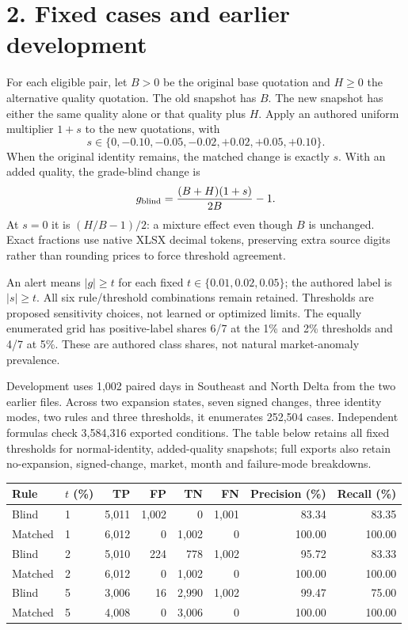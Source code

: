 \documentclass[10pt,letterpaper]{article}
\begin{document}
\section*{2. Fixed cases and earlier development}
For each eligible pair, let $B>0$ be the original base quotation and $H\geq0$ the alternative quality quotation. The old snapshot has $B$. The new snapshot has either the same quality alone or that quality plus $H$. Apply an authored uniform multiplier $1+s$ to the new quotations, with
\[
s\in\{0,-0.10,-0.05,-0.02,+0.02,+0.05,+0.10\}.
\]
When the original identity remains, the matched change is exactly $s$. With an added quality, the grade-blind change is
\[
g_{\rm blind}=\frac{(B+H)(1+s)}{2B}-1.
\]
At $s=0$ it is $(H/B-1)/2$: a mixture effect even though $B$ is unchanged. Exact fractions use native XLSX decimal tokens, preserving extra source digits rather than rounding prices to force threshold agreement.

An alert means $|g|\geq t$ for each fixed $t\in\{0.01,0.02,0.05\}$; the authored label is $|s|\geq t$. All six rule/threshold combinations remain retained. Thresholds are proposed sensitivity choices, not learned or optimized limits. The equally enumerated grid has positive-label shares 6/7 at the 1\% and 2\% thresholds and 4/7 at 5\%. These are authored class shares, not natural market-anomaly prevalence.

Development uses 1,002 paired days in Southeast and North Delta from the two earlier files. Across two expansion states, seven signed changes, three identity modes, two rules and three thresholds, it enumerates 252,504 cases. Independent formulas check 3,584,316 exported conditions. The table below retains all fixed thresholds for normal-identity, added-quality snapshots; full exports also retain no-expansion, signed-change, market, month and failure-mode breakdowns.

\begin{center}\small\begin{tabular}{llrrrrrr}\toprule
Rule & $t$ (\%) & TP & FP & TN & FN & Precision (\%) & Recall (\%)\\\midrule
Blind & 1 & 5,011 & 1,002 & 0 & 1,001 & 83.34 & 83.35 \\
Matched & 1 & 6,012 & 0 & 1,002 & 0 & 100.00 & 100.00 \\
Blind & 2 & 5,010 & 224 & 778 & 1,002 & 95.72 & 83.33 \\
Matched & 2 & 6,012 & 0 & 1,002 & 0 & 100.00 & 100.00 \\
Blind & 5 & 3,006 & 16 & 2,990 & 1,002 & 99.47 & 75.00 \\
Matched & 5 & 4,008 & 0 & 3,006 & 0 & 100.00 & 100.00 \\
\bottomrule\end{tabular}\end{center}
\end{document}
